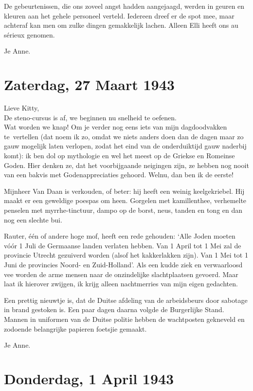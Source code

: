 \documentclass{book}
\begin{document}
De gebeurtenissen, die ons zoveel angst hadden aangejaagd, werden in
geuren en kleuren aan het gehele personeel verteld. Iedereen dreef er de
spot mee, maar achteraf kan men om zulke dingen gemakkelijk lachen.
Alleen Elli heeft ons au sérieux genomen.

Je Anne.

\chapter{Zaterdag, 27 Maart 1943}

Lieve Kitty,\\De steno-cursus is af, we beginnen nu snelheid te
oefenen.\\Wat worden we knap! Om je verder nog eens iets van mijn
dagdoodvakken te~vertellen (dat noem ik zo, omdat we niets anders doen
dan de dagen maar zo gauw mogelijk laten verlopen, zodat het eind van de
onderduiktijd gauw naderbij komt): ik ben dol op mythologie en wel het
meest op de Griekse en Romeinse Goden. Hier denken ze, dat het
voorbijgaande neigingen zijn, ze hebben nog nooit van een bakvis met
Godenappreciaties gehoord. Welnu, dan ben ik de eerste!

Mijnheer Van Daan is verkouden, of beter: hij heeft een weinig
keelgekriebel. Hij maakt er een geweldige poespas om heen. Gorgelen met
kamillenthee, verhemelte penselen met myrrhe-tinctuur, dampo op de
borst, neus, tanden en tong en dan nog een slechte bui.

Rauter, één of andere hoge mof, heeft een rede gehouden: `Alle Joden
moeten vóór 1 Juli de Germaanse landen verlaten hebben. Van 1 April tot
1 Mei zal de provincie Utrecht gezuiverd worden (alsof het kakkerlakken
zijn). Van 1 Mei tot 1 Juni de provincies Noord- en Zuid-Holland'. Als
een kudde ziek en verwaarloosd vee worden de arme mensen naar de
onzindelijke slachtplaatsen gevoerd. Maar laat ik hierover zwijgen, ik
krijg alleen nachtmerries van mijn eigen gedachten.

Een prettig nieuwtje is, dat de Duitse afdeling van de arbeidsbeurs door
sabotage in brand gestoken is. Een paar dagen daarna volgde de
Burgerlijke Stand. Mannen in uniformen van de Duitse politie hebben de
wachtposten gekneveld en zodoende belangrijke papieren foetsjie gemaakt.

Je Anne.

\chapter{Donderdag, 1 April 1943}
\end{document}
